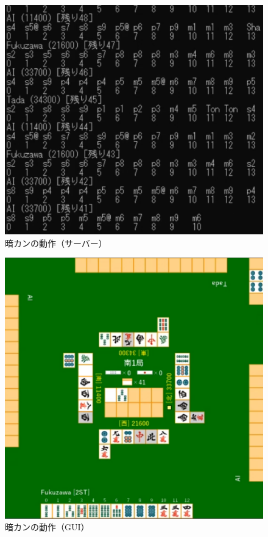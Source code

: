 \documentclass[a4j,titlepage]{jsarticle}
\begin{document}
\begin{figure}[H]
  \centering
  \includegraphics[scale = 0.8]{images/ankan_server.png}
  \caption{暗カンの動作（サーバー）}
  \label{fig:ankan_server}
\end{figure}

\begin{figure}[H]
  \centering
  \includegraphics[scale = 0.8]{images/ankan_gui.png}
  \caption{暗カンの動作（GUI）}
  \label{fig:ankan_gui}
\end{figure}
\end{document}
